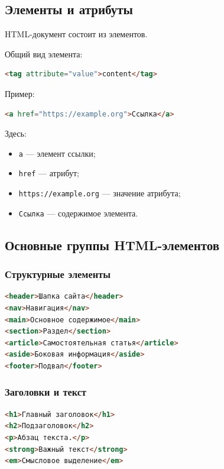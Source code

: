 \documentclass[12pt,a4paper]{article}
\begin{document}
\subsection{Элементы и атрибуты}

HTML-документ состоит из элементов.

Общий вид элемента:
\begin{lstlisting}[language=HTML]
<tag attribute="value">content</tag>
\end{lstlisting}

Пример:
\begin{lstlisting}[language=HTML]
<a href="https://example.org">Ссылка</a>
\end{lstlisting}

Здесь:
\begin{itemize}
    \item \texttt{a} --- элемент ссылки;
    \item \texttt{href} --- атрибут;
    \item \texttt{https://example.org} --- значение атрибута;
    \item \texttt{Ссылка} --- содержимое элемента.
\end{itemize}

\subsection{Основные группы HTML-элементов}

\subsubsection{Структурные элементы}

\begin{lstlisting}[language=HTML]
<header>Шапка сайта</header>
<nav>Навигация</nav>
<main>Основное содержимое</main>
<section>Раздел</section>
<article>Самостоятельная статья</article>
<aside>Боковая информация</aside>
<footer>Подвал</footer>
\end{lstlisting}

\subsubsection{Заголовки и текст}

\begin{lstlisting}[language=HTML]
<h1>Главный заголовок</h1>
<h2>Подзаголовок</h2>
<p>Абзац текста.</p>
<strong>Важный текст</strong>
<em>Смысловое выделение</em>
\end{lstlisting}
\end{document}
